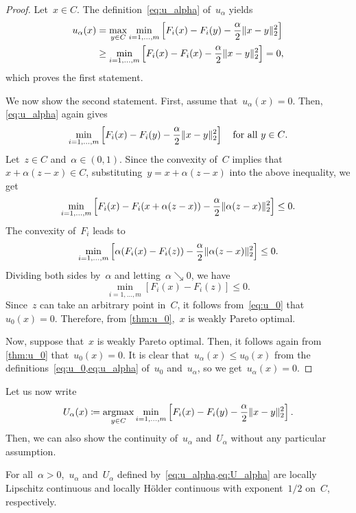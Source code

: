\documentclass[../../main]{subfiles}
\begin{document}
\begin{proof}
    Let~$x \in C$.
    The definition~\cref{eq:u_alpha} of~$u_\alpha$ yields
    \[
        \begin{split}
            u_\alpha(x) &= \max_{y \in C} \min_{i = 1, \dots, m} \left[ F_i(x) - F_i(y) - \frac{\alpha}{2} \lVert x - y\rVert_2^2 \right] \\
                      &\ge \min_{i = 1, \dots, m} \left[ F_i(x) - F_i(x) - \frac{\alpha}{2} \lVert x - y\rVert_2^2 \right] = 0
        ,\end{split}
    \] 
    which proves the first statement.

    We now show the second statement.
    First, assume that~$u_\alpha(x) = 0$.
    Then, \cref{eq:u_alpha} again gives
    \[
        \min_{i = 1, \dots, m} \left[ F_i(x) - F_i(y) - \frac{\alpha}{2} \lVert x - y\rVert_2^2 \right] \quad \text{for all~$y \in C$}
    .\] 
    Let~$z \in C$ and~$\alpha \in (0, 1)$.
    Since the convexity of~$C$ implies that~$x + \alpha (z - x) \in C$, substituting~$y = x + \alpha (z - x)$ into the above inequality, we get
    \[
        \min_{i = 1, \dots, m} \left[ F_i(x) - F_i(x + \alpha(z - x)) - \frac{\alpha}{2} \lVert\alpha (z - x)\rVert_2^2 \right] \le 0
    .\] 
    The convexity of~$F_i$ leads to
    \[
        \min_{i = 1, \dots, m} \left[ \alpha (F_i(x) - F_i(z)) - \frac{\alpha}{2} \lVert\alpha (z - x)\rVert_2^2 \right] \le 0
    .\] 
    Dividing both sides by~$\alpha$ and letting~$\alpha \searrow 0$, we have
    \[
        \min_{i = 1, \dots, m} [ F_i(x) - F_i(z) ] \le 0
    .\] 
    Since~$z$ can take an arbitrary point in~$C$, it follows from~\cref{eq:u_0} that~$u_0(x) = 0$.
    Therefore, from \cref{thm:u_0},~$x$ is weakly Pareto optimal.

    Now, suppose that~$x$ is weakly Pareto optimal.
    Then, it follows again from \cref{thm:u_0} that~$u_0(x) = 0$.
    It is clear that~$u_\alpha(x) \le u_0(x)$ from the definitions~\cref{eq:u_0,eq:u_alpha} of~$u_0$ and~$u_\alpha$, so we get~$u_\alpha(x) = 0$.
\end{proof}
Let us now write
\begin{equation} \label{eq:U_alpha}
    U_\alpha(x) \coloneqq \operatorname*{argmax}_{y \in C} \min_{i = 1, \dots, m} \left[ F_i(x) - F_i(y) - \frac{\alpha}{2}\lVert x - y\rVert_2^2 \right] 
.\end{equation} 
Then, we can also show the continuity of~$u_\alpha$ and~$U_\alpha$ without any particular assumption.
\begin{theorem} \label{thm:cont_u_alpha}
    For all~$\alpha > 0$,~$u_\alpha$ and~$U_\alpha$ defined by~\cref{eq:u_alpha,eq:U_alpha} are locally Lipschitz continuous and locally H\"older continuous with exponent~$1 / 2$ on~$C$, respectively.
\end{theorem}
\end{document}
